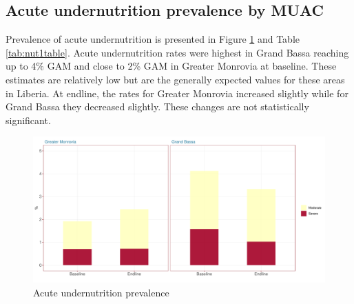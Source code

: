 \documentclass[12pt,a4paper]{article}
\begin{document}
\newpage

\hypertarget{acute-undernutrition-prevalence-by-muac}{%
\subsection{Acute undernutrition prevalence by MUAC}\label{acute-undernutrition-prevalence-by-muac}}

Prevalence of acute undernutrition is presented in Figure \ref{fig:nut1plot} and Table \ref{tab:nut1table}. Acute undernutrition rates were highest in Grand Bassa reaching up to 4\% GAM and close to 2\% GAM in Greater Monrovia at baseline. These estimates are relatively low but are the generally expected values for these areas in Liberia. At endline, the rates for Greater Monrovia increased slightly while for Grand Bassa they decreased slightly. These changes are not statistically significant.

\begin{figure}[H]

{\centering \includegraphics{liberiaCoverageFinalReport_files/figure-latex/nut1plot-1} 

}

\caption{Acute undernutrition prevalence}\label{fig:nut1plot}
\end{figure}
\end{document}
